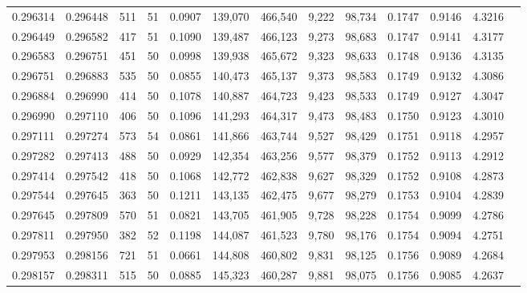 \begin{tabular}{rrrrrrrrrrrrr}
0.296314 & 0.296448 &   511 &  51 &                                     0.0907 & 139,070 & 466,540 &   9,222 &  98,734 & 0.1747 & 0.9146 & 4.3216 \\
0.296449 & 0.296582 &   417 &  51 &                                     0.1090 & 139,487 & 466,123 &   9,273 &  98,683 & 0.1747 & 0.9141 & 4.3177 \\
0.296583 & 0.296751 &   451 &  50 &                                     0.0998 & 139,938 & 465,672 &   9,323 &  98,633 & 0.1748 & 0.9136 & 4.3135 \\
0.296751 & 0.296883 &   535 &  50 &                                     0.0855 & 140,473 & 465,137 &   9,373 &  98,583 & 0.1749 & 0.9132 & 4.3086 \\
0.296884 & 0.296990 &   414 &  50 &                                     0.1078 & 140,887 & 464,723 &   9,423 &  98,533 & 0.1749 & 0.9127 & 4.3047 \\
0.296990 & 0.297110 &   406 &  50 &                                     0.1096 & 141,293 & 464,317 &   9,473 &  98,483 & 0.1750 & 0.9123 & 4.3010 \\
0.297111 & 0.297274 &   573 &  54 &                                     0.0861 & 141,866 & 463,744 &   9,527 &  98,429 & 0.1751 & 0.9118 & 4.2957 \\
0.297282 & 0.297413 &   488 &  50 &                                     0.0929 & 142,354 & 463,256 &   9,577 &  98,379 & 0.1752 & 0.9113 & 4.2912 \\
0.297414 & 0.297542 &   418 &  50 &                                     0.1068 & 142,772 & 462,838 &   9,627 &  98,329 & 0.1752 & 0.9108 & 4.2873 \\
0.297544 & 0.297645 &   363 &  50 &                                     0.1211 & 143,135 & 462,475 &   9,677 &  98,279 & 0.1753 & 0.9104 & 4.2839 \\
0.297645 & 0.297809 &   570 &  51 &                                     0.0821 & 143,705 & 461,905 &   9,728 &  98,228 & 0.1754 & 0.9099 & 4.2786 \\
0.297811 & 0.297950 &   382 &  52 &                                     0.1198 & 144,087 & 461,523 &   9,780 &  98,176 & 0.1754 & 0.9094 & 4.2751 \\
0.297953 & 0.298156 &   721 &  51 &                                     0.0661 & 144,808 & 460,802 &   9,831 &  98,125 & 0.1756 & 0.9089 & 4.2684 \\
0.298157 & 0.298311 &   515 &  50 &                                     0.0885 & 145,323 & 460,287 &   9,881 &  98,075 & 0.1756 & 0.9085 & 4.2637 \\

\end{tabular}
